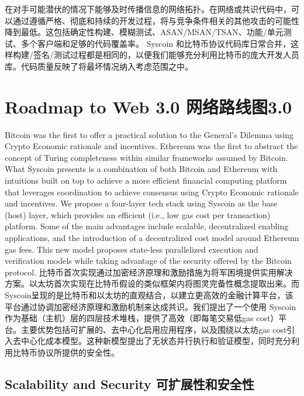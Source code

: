 \documentclass{ctexart}
\begin{document}
在对手可能潜伏的情况下能够及时传播信息的网络拓扑。在网络或共识代码中，可以通过遵循严格、彻底和持续的开发过程，将与竞争条件相关的其他攻击的可能性降到最低。这包括确定性构建、模糊测试、ASAN/MSAN/TSAN、功能/单元测试、多个客户端和足够的代码覆盖率。 Syscoin 和比特币协议代码库日常合并，这样构建/签名/测试过程都是相同的，以便我们能够充分利用比特币的庞大开发人员库。代码质量反映了将最坏情况纳入考虑范围之中。

\section{Roadmap to Web 3.0 网络路线图3.0}
\label{section:roadmap}

Bitcoin was the first to offer a practical solution to the General's Dilemma using Crypto Economic rationale and incentives. Ethereum was the first to abstract the concept of Turing completeness within similar frameworks assumed by Bitcoin. What Syscoin presents is a combination of both Bitcoin and Ethereum with intuitions built on top to achieve a more efficient financial computing platform that leverages coordination to achieve consensus using Crypto Economic rationale and incentives. We propose a four-layer tech stack using Syscoin as the base (host) layer, which provides an efficient (i.e., low gas cost per transaction) platform. Some of the main advantages include scalable, decentralized enabling applications, and the introduction of a decentralized cost model around Ethereum gas fees. This new model proposes state-less parallelized execution and verification models while taking advantage of the security offered by the Bitcoin protocol. 比特币首次实现通过加密经济原理和激励措施为将军困境提供实用解决方案。以太坊首次实现在比特币假设的类似框架内将图灵完备性概念提取出来。而Syscoin呈现的是比特币和以太坊的直观结合，以建立更高效的金融计算平台，该平台通过协调加密经济原理和激励机制来达成共识。我们提出了一个使用 Syscoin 作为基础（主机）层的四层技术堆栈，提供了高效（即每笔交易低gas cost）平台。主要优势包括可扩展的、去中心化启用应用程序，以及围绕以太坊gas cost引入去中心化成本模型。这种新模型提出了无状态并行执行和验证模型，同时充分利用比特币协议所提供的安全性。

\subsection{Scalability and Security 可扩展性和安全性}
\end{document}
